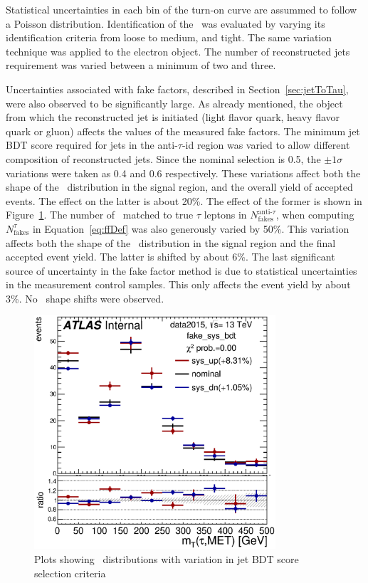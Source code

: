 Statistical uncertainties in each bin of the turn-on curve are assummed to follow a Poisson 
distribution. Identification of the \tauvis\ was evaluated by varying its identification 
criteria from loose to medium, and tight. The same variation technique was applied to 
the electron object. The number of reconstructed jets requirement was varied between a minimum 
of two and three. %

\par Uncertainties associated with fake factors, described in Section~\ref{sec:jetToTau}, were also 
 observed to be significantly large. 
As already mentioned, the object from which the reconstructed jet is initiated (light flavor 
quark, heavy flavor quark or gluon) affects the values of the measured fake factors. The minimum 
jet BDT score required for jets in the anti-$\tau$-id region was varied to allow different composition 
of reconstructed jets. Since the nominal selection is 0.5, the $\pm 1\sigma$ variations were taken 
as 0.4 and 0.6 respectively. These variations affect both the shape of the \mT\ distribution in 
the signal region, and the overall yield of accepted events. The effect on the latter is about 20\%. 
The effect of the former is shown in Figure~\ref{fig:bdtFF}. 
The number of \tauvis\ matched to true $\tau$ leptons in $N^{\text{anti-}\tau}_{\text{fakes}}$, when 
computing $N^{\tau}_{\text{fakes}}$ in Equation~\ref{eq:ffDef} was also generously varied by 50\%. 
This variation affects both the shape of the \mT\ distribution in the signal region and the final 
accepted event yield. The latter is shifted by about 6\%. The last significant source  of uncertainty in 
the fake factor method is due to statistical uncertainties in the measurement control samples. This only 
affects the event yield by about 3\%. No \mT\ shape shifts were observed.   

\begin{figure}[!h]
\centering
   \includegraphics[width=0.8\textwidth]{figures/Syst_fake_sys_bdt.eps}
\caption{Plots showing \mT\ distributions with variation in jet BDT score selection criteria}
\label{fig:bdtFF}
\end{figure}

